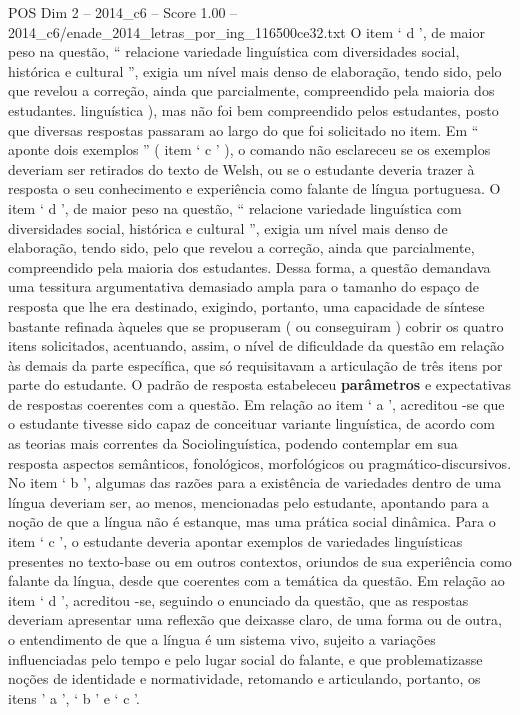 \begin{textsample}{POS Dim 2 – 2014\_c6 – Score 1.00 – 2014\_c6/enade\_2014\_letras\_por\_ing\_116500ce32.txt}
O item ‘ d ’, de maior peso na questão, “ relacione variedade linguística com diversidades social, histórica e cultural ”, exigia um nível mais denso de elaboração, tendo sido, pelo que revelou a correção, ainda que parcialmente, compreendido pela maioria dos estudantes. linguística ), mas não foi bem compreendido pelos estudantes, posto que diversas respostas passaram ao largo do que foi solicitado no item.
Em “ aponte dois exemplos ” ( item ‘ c ’ ), o comando não esclareceu se os exemplos deveriam ser retirados do texto de Welsh, ou se o estudante deveria trazer à resposta o seu conhecimento e experiência como falante de língua portuguesa.
O item ‘ d ’, de maior peso na questão, “ relacione variedade linguística com diversidades social, histórica e cultural ”, exigia um nível mais denso de elaboração, tendo sido, pelo que revelou a correção, ainda que parcialmente, compreendido pela maioria dos estudantes.
Dessa forma, a questão demandava uma tessitura argumentativa demasiado ampla para o tamanho do espaço de resposta que lhe era destinado, exigindo, portanto, uma capacidade de síntese bastante refinada àqueles que se propuseram ( ou conseguiram ) cobrir os quatro itens solicitados, acentuando, assim, o nível de dificuldade da questão em relação às demais da parte específica, que só requisitavam a articulação de três itens por parte do estudante.
O padrão de resposta estabeleceu \textbf{parâmetros} e expectativas de respostas coerentes com a questão.
Em relação ao item ‘ a ’, acreditou -se que o estudante tivesse sido capaz de conceituar variante linguística, de acordo com as teorias mais correntes da Sociolinguística, podendo contemplar em sua resposta aspectos semânticos, fonológicos, morfológicos ou pragmático-discursivos.
No item ‘ b ’, algumas das razões para a existência de variedades dentro de uma língua deveriam ser, ao menos, mencionadas pelo estudante, apontando para a noção de que a língua não é estanque, mas uma prática social dinâmica.
Para o item ‘ c ’, o estudante deveria apontar exemplos de variedades linguísticas presentes no texto-base ou em outros contextos, oriundos de sua experiência como falante da língua, desde que coerentes com a temática da questão.
Em relação ao item ‘ d ’, acreditou -se, seguindo o enunciado da questão, que as respostas deveriam apresentar uma reflexão que deixasse claro, de uma forma ou de outra, o entendimento de que a língua é um sistema vivo, sujeito a variações influenciadas pelo tempo e pelo lugar social do falante, e que problematizasse noções de identidade e normatividade, retomando e articulando, portanto, os itens ’ a ’, ‘ b ’ e ‘ c ’.

\end{textsample}
